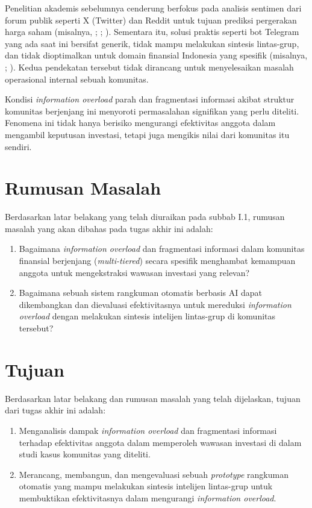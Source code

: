 Penelitian akademis sebelumnya cenderung berfokus pada analisis sentimen dari forum publik seperti X (Twitter) dan Reddit untuk tujuan prediksi pergerakan harga saham (misalnya, \textcite{bollen2011}; \textcite{sianipar2023}; \textcite{liew2021}). Sementara itu, solusi praktis seperti bot Telegram yang ada saat ini bersifat generik, tidak mampu melakukan sintesis lintas-grup, dan tidak dioptimalkan untuk domain finansial Indonesia yang spesifik (misalnya, \textcite{stars2023}; \textcite{panda2023}). Kedua pendekatan tersebut tidak dirancang untuk menyelesaikan masalah operasional internal sebuah komunitas.

Kondisi \textit{information overload} parah dan fragmentasi informasi akibat struktur komunitas berjenjang ini menyoroti permasalahan signifikan yang perlu diteliti. Fenomena ini tidak hanya berisiko mengurangi efektivitas anggota dalam mengambil keputusan investasi, tetapi juga mengikis nilai dari komunitas itu sendiri.

\section{Rumusan Masalah}
Berdasarkan latar belakang yang telah diuraikan pada subbab I.1, rumusan masalah yang akan dibahas pada tugas akhir ini adalah:

\begin{enumerate}
\item Bagaimana \textit{information overload} dan fragmentasi informasi dalam komunitas finansial berjenjang (\textit{multi-tiered}) secara spesifik menghambat kemampuan anggota untuk mengekstraksi wawasan investasi yang relevan?
\item Bagaimana sebuah sistem rangkuman otomatis berbasis AI dapat dikembangkan dan dievaluasi efektivitasnya untuk mereduksi \textit{information overload} dengan melakukan sintesis intelijen lintas-grup di komunitas tersebut?
\end{enumerate}

\section{Tujuan}
Berdasarkan latar belakang dan rumusan masalah yang telah dijelaskan, tujuan dari tugas akhir ini adalah:

\begin{enumerate}
\item Menganalisis dampak \textit{information overload} dan fragmentasi informasi terhadap efektivitas anggota dalam memperoleh wawasan investasi di dalam studi kasus komunitas yang diteliti.
\item Merancang, membangun, dan mengevaluasi sebuah \textit{prototype} rangkuman otomatis yang mampu melakukan sintesis intelijen lintas-grup untuk membuktikan efektivitasnya dalam mengurangi \textit{information overload}.
\end{enumerate}

